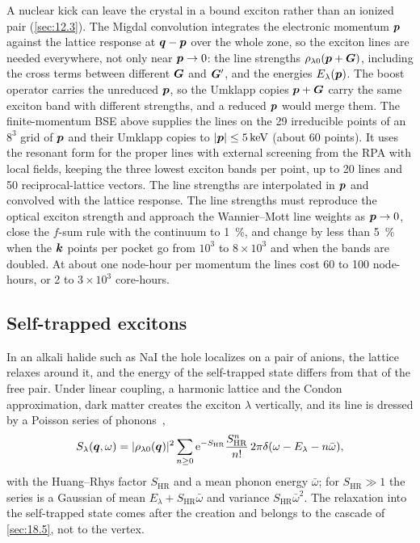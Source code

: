A nuclear kick can leave the crystal in a bound exciton rather than an ionized pair (\cref{sec:12.3}). The Migdal convolution integrates the electronic momentum $\bm{p}$ against the lattice response at $\bm{q} - \bm{p}$ over the whole zone, so the exciton lines are needed everywhere, not only near $\bm{p}\to0$: the line strengths $\rho_{\lambda0}(\bm{p}+\bm{G})$, including the cross terms between different $\bm{G}$ and $\bm{G}'$, and the energies $E_\lambda(\bm{p})$. The boost operator carries the unreduced $\bm{p}$, so the Umklapp copies $\bm{p}+\bm{G}$ carry the same exciton band with different strengths, and a reduced $\bm{p}$ would merge them. The finite-momentum BSE above supplies the lines on the 29 irreducible points of an $8^3$ grid of $\bm{p}$ and their Umklapp copies to $|\bm{p}| \le \SI{5}{keV}$ (about 60 points). It uses the resonant form for the proper lines with external screening from the RPA with local fields, keeping the three lowest exciton bands per point, up to 20 lines and 50 reciprocal-lattice vectors. The line strengths are interpolated in $\bm{p}$ and convolved with the lattice response. The line strengths must reproduce the optical exciton strength and approach the Wannier--Mott line weights as $\bm{p}\to0$, close the $f$-sum rule with the continuum to \SI{1}{\percent}, and change by less than \SI{5}{\percent} when the $\bm{k}$ points per pocket go from $10^3$ to $8\times10^3$ and when the bands are doubled. At about one node-hour per momentum the lines cost 60 to 100 node-hours, or 2 to $3\times10^3$ core-hours.

\subsection{Self-trapped excitons}

In an alkali halide such as NaI the hole localizes on a pair of anions, the lattice relaxes around it, and the energy of the self-trapped state differs from that of the free pair. Under linear coupling, a harmonic lattice and the Condon approximation, dark matter creates the exciton $\lambda$ vertically, and its line is dressed by a Poisson series of phonons~\cite{huang1950theory},
\begin{equation}
  S_\lambda(\bm{q},\omega) = |\rho_{\lambda0}(\bm{q})|^2\sum_{n\ge0}\mathrm{e}^{-S_{\mathrm{HR}}}\frac{S_{\mathrm{HR}}^n}{n!}\,2\pi\delta(\omega - E_\lambda - n\bar\omega) ,
  \label{eq:E.15-ste}
\end{equation}
with the Huang--Rhys factor $S_{\mathrm{HR}}$ and a mean phonon energy $\bar\omega$; for $S_{\mathrm{HR}} \gg 1$ the series is a Gaussian of mean $E_\lambda + S_{\mathrm{HR}}\bar\omega$ and variance $S_{\mathrm{HR}}\bar\omega^2$. The relaxation into the self-trapped state comes after the creation and belongs to the cascade of \cref{sec:18.5}, not to the vertex.

